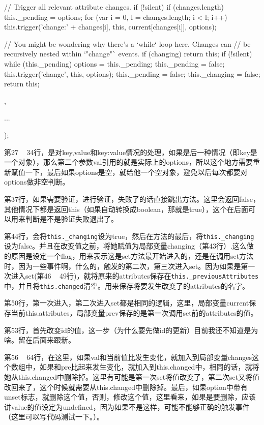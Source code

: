 \begin{JavaScript}
{{      // Trigger all relevant attribute changes.
      if (!silent) {
        if (changes.length) this._pending = options;
        for (var i = 0, l = changes.length; i < l; i++) {
          this.trigger('change:' + changes[i], this, current[changes[i]], options);
        }
      }

      // You might be wondering why there's a `while` loop here. Changes can
      // be recursively nested within `"change"` events.
      if (changing) return this;
      if (!silent) {
        while (this._pending) {
          options = this._pending;
          this._pending = false;
          this.trigger('change', this, options);
        }
      }
      this._pending = false;
      this._changing = false;
      return this;
    },
	
	...

  });
\end{JavaScript}

第27 ~ 34行，是对key,value和{key:value}情况的处理，如果是后一种情况（即key是一个对象），那么第二个参数val引用的就是实际上的options，所以这个地方需要重新赋值一下，最后如果options是空，就给他一个空对象，避免以后每次都要对options做非空判断。


第37行，如果需要验证，进行验证，失败了的话直接跳出方法。这里会返回false，其他情况下都是返回this（如果自动转换成boolean，那就是true），这个在后面可以用来判断是不是验证失败退出了。

第44行，会将\lstinline$this._changing$设为true，然后在方法的最后，将\lstinline$this._changing$设为false。并且在改变值之前，将她赋值为局部变量changing（第43行）.这么做的原因是设定一个flag，用来表示这是set方法最开始进入的，还是在调用set方法时，因为一些事件啊，什么的，触发的第二次，第三次进入set。因为如果是第一次进入set(第46 ~ 49行)，就将原来的attributes保存在\lstinline$this._previousAttributes$ 中，并且将\lstinline$this.changed$清空。用来保存将要发生改变了的attributes的名字。

第50行，第一次进入，第二次进入set都是相同的逻辑，这里，局部变量current保存当前this.attributes，局部变量prev保存的是第一次调用set前的attributes的值。

第53行，首先改变id的值，这一步（为什么要先做id的更新）目前我还不知道是为啥。留在后面来跟新。


第56 ~ 64行，在这里，如果val和当前值比发生变化，就加入到局部变量changes这个数组中，如果和pre比起来发生变化，就加入到this.changed中，相同的话，就将她从this.changed中删除掉。这里有可能是第一次set将值改变了，第二次set又将值改回来了，这个时候就需要从this.changed中删除掉。最后，如果option中带有unset标志，就删除这个值，否则，修改这个值，这里看来，如果是要删除，应该讲value的值设定为undefined，因为如果不是这样，可能不能够正确的触发事件（这里可以写代码测试一下。）。



